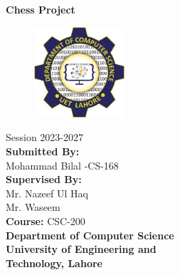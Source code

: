 \documentclass[a4paper,12pt]{article}
\begin{document}
\thispagestyle{empty} 

\vspace*{1cm} 

\begin{center}
    {\Huge\textbf {Chess Project}}  
    \vspace{1cm}  

    \begin{figure}[h!]
        \centering
        \includegraphics[width=0.3\textwidth]{Images/logo.jpg}
    \end{figure}
    
    {\large Session 2023-2027}\\[0.2cm]
    \vspace{0.7cm}
    {\Large\textbf {Submitted By: }}\\[0.6cm]
    {\large {Mohammad Bilal \space\space{}-CS-168}}\\[0.6cm]
    {\Large\textbf {Supervised By: }}\\[0.6cm]
    {\large {Mr. Nazeef Ul Haq }}\\[0.4cm]
    {\large {Mr. Waseem }}\\[0.6cm]
    {\Large\textbf {Course: } CSC-200}\\[1.2cm]
    {\LARGE \textbf{ Department of Computer Science}}\\[0.7cm]
    {\Huge \textbf{University of Engineering and}}\\[0.5cm]
    {\Huge \textbf{Technology, Lahore}}\\[0.5cm]
    \vfill
\end{center}

\thispagestyle{empty} 


\renewcommand{\contentsname}{Table of Contents}

\tableofcontents

\newpage

\thispagestyle{empty}

\listoffigures

\newpage
\end{document}
